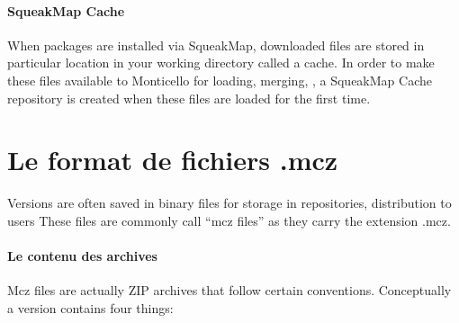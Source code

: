 \documentclass[a4paper,10pt,twoside]{book}
\begin{document}
\paragraph{SqueakMap Cache} When packages are installed via SqueakMap, downloaded files are stored in particular location  in your working directory called a cache. In order to make these files available to Monticello for loading, merging, \etc, a SqueakMap Cache repository is created when these files are loaded for the first time.





\section{Le format de fichiers .mcz} %

Versions are often  saved in binary files for storage in repositories, distribution to users \etc
These files are commonly call ``mcz files'' as they carry the extension .mcz.

\paragraph{Le contenu des archives} %

Mcz files are actually ZIP archives that follow certain conventions. Conceptually a version contains four things:
\end{document}
